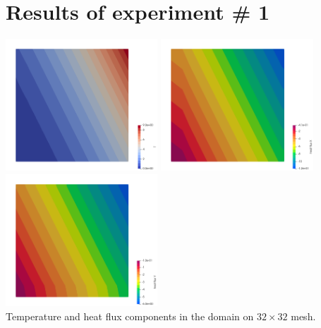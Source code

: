 \newpage
\section*{Results of experiment \# 1}

\begin{center}
\includegraphics[width=5.7cm]{python_codes/fieldstone_173/results/exp1/T}
\includegraphics[width=5.7cm]{python_codes/fieldstone_173/results/exp1/qx}
\includegraphics[width=5.7cm]{python_codes/fieldstone_173/results/exp1/qy}\\
{\captionfont Temperature and heat flux components in the domain on $32 \times 32$ mesh.}
\end{center}

